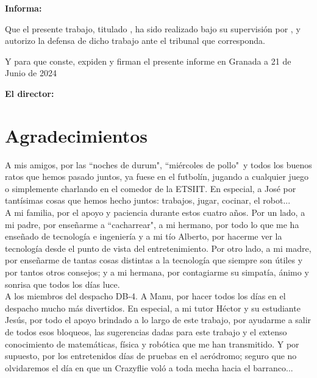 \textbf{Informa:}

\vspace{0.5cm}

Que el presente trabajo, titulado \textit{\textbf{\myTitle}},
ha sido realizado bajo su supervisión por \textbf{\myName}, y 
autorizo
la defensa de dicho trabajo ante el tribunal que corresponda.

\vspace{0.5cm}

Y para que conste, expiden y firman el presente informe en Granada a 21 de Junio de 2024

\vspace{1cm}

\textbf{El director:}

\vspace{5cm}

\begin{center}
    \noindent \centering \textbf{\myProf}
\end{center}


\chapter*{Agradecimientos}

\thispagestyle{empty}

A mis amigos, por las ``noches de durum", ``miércoles de pollo"\
y todos los buenos ratos que hemos pasado juntos, 
ya fuese en el futbolín, jugando a cualquier juego o simplemente charlando en el comedor de la ETSIIT. 
En especial, a José por tantísimas cosas que hemos hecho juntos: 
trabajos, jugar, cocinar, el robot... \\

A mi familia, por el apoyo y paciencia durante estos cuatro años. 
Por un lado, a mi padre, por enseñarme a ``cacharrear", 
a mi hermano, por todo lo que me ha enseñado de tecnología e ingeniería y 
a mi tío Alberto, por hacerme ver la tecnología desde el punto de vista del entretenimiento.
Por otro lado, a mi madre, por enseñarme de tantas cosas distintas a la tecnología que siempre son útiles y por tantos otros consejos; 
y a mi hermana, por contagiarme su simpatía, ánimo y sonrisa que todos los días luce. \\

A los miembros del despacho DB-4.
A Manu, por hacer todos los días en el despacho mucho más divertidos. 
En especial, a mi tutor Héctor y su estudiante Jesús, por todo el apoyo brindado a lo largo de este trabajo, 
por ayudarme a salir de todos esos bloqueos, las sugerencias dadas para este trabajo y 
el extenso conocimiento de matemáticas, física y robótica que me han transmitido.
Y por supuesto, por los entretenidos días de pruebas en el aeródromo; 
seguro que no olvidaremos el día en que un Crazyflie voló a toda mecha hacia el barranco... \\